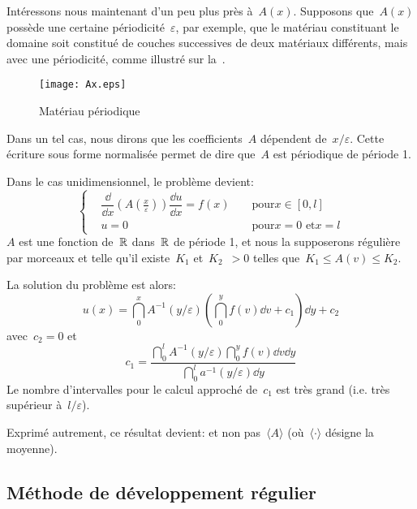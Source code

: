 \medskip
Intéressons nous maintenant d'un peu plus près à~$A(x)$.
Supposons que~$A(x)$ possède une certaine périodicité~$\varepsilon$,
par exemple, que le matériau constituant le domaine soit constitué de couches successives
de deux matériaux différents, mais avec une périodicité, comme illustré sur la~.
\begin{figure}[ht]
\centering\texttt{[image: Ax.eps]}
\caption{Matériau périodique}\label{Fig-Ax}
\end{figure}
Dans un tel cas, nous dirons que les coefficients~$A$ dépendent de~$x/\varepsilon$.
Cette écriture sous forme normalisée permet de dire que~$A$ est périodique de période 1.

\medskip
Dans le cas unidimensionnel, le problème devient:
\begin{equation}
\left\{
\begin{aligned}
&\dfrac \dd{\dd x}\left(A\left(\frac x\varepsilon\right)\right) \dfrac{\dd u}{\dd x} = f(x)&& \text{ pour} x\in[0,l]\\
&u=0 &&\text{ pour} x=0 \text{ et} x=l
\end{aligned}
\right.
\end{equation}
$A$ est une fonction de~$\mathbb R$ dans~$\mathbb R$ de période 1, et nous la supposerons régulière
par morceaux et telle qu'il existe~$K_1$ et~$K_2$~$>0$ telles que~$K_1\le A(v)\le K_2$.

\medskip
La solution du problème est alors:
\begin{equation}
u(x)=\dint_0^x A^{-1}(y/\varepsilon) \left(\dint_0^y f(v)\dd v + c_1 \right) \dd y + c_2
\end{equation}
avec~$c_2=0$ et
\begin{equation} c_1 = \dfrac{\dint_0^l A^{-1}(y/\varepsilon)\dint_0^y f(v)\dd v \dd y}{\dint_0^l a^{-1}(y/\varepsilon)\dd y} \end{equation}
Le nombre d'intervalles pour le calcul approché de~$c_1$ est très grand (i.e. très supérieur
à~$l/\varepsilon$).

Exprimé autrement, ce résultat devient:
 et non pas~$\langle A\rangle$
(où~$\langle\cdot\rangle$ désigne la moyenne).


\medskip
\subsection{Méthode de développement régulier}

